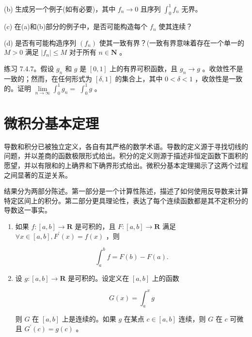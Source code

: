 (b) 生成另一个例子(如有必要)，其中 \({f}_{n} \rightarrow  0\) 且序列 \({\int }_{0}^{1}{f}_{n}\) 无界。

(c) 在(a)和(b)部分的例子中，是否可能构造每个 \({f}_{n}\) 使其连续？

(d) 是否有可能构造序列 \(\left( {f}_{n}\right)\) 使其一致有界？(一致有界意味着存在一个单一的 \(M > 0\) 满足 \(\left| {f}_{n}\right|  \leq  M\) 对于所有 \(n \in  \mathbf{N}\) 。

练习 7.4.7。假设 \({g}_{n}\) 和 \(g\) 是 \(\left\lbrack  {0,1}\right\rbrack\) 上的有界可积函数，且 \({g}_{n} \rightarrow  g\) 。收敛性不是一致的；然而，在任何形式为 \(\left\lbrack  {\delta ,1}\right\rbrack\) 的集合上，其中 \(0 < \delta  < 1\) ，收敛性是一致的。证明 \(\mathop{\lim }\limits_{{n \rightarrow  \infty }}{\int }_{0}^{1}{g}_{n} =\)  \({\int }_{0}^{1}g\) 。

\section{微积分基本定理}
\label{sec:7.5}
导数和积分已被独立定义，各自有其严格的数学术语。导数的定义源于寻找切线的问题，并以差商的函数极限形式给出。积分的定义则源于描述非恒定函数下面积的愿望，并以有限和的上确界和下确界形式给出。微积分基本定理揭示了这两个过程之间显著的互逆关系。

结果分为两部分陈述。第一部分是一个计算性陈述，描述了如何使用反导数来计算特定区间上的积分。第二部分更具理论性，表达了每个连续函数都是其不定积分的导数这一事实。

\begin{Thm}
  \label{thm:7.5.1}
  \begin{enumerate}[label = (\roman*)]
  \item\label{item:7.5.1}如果 \(f : \left\lbrack  {a,b}\right\rbrack   \rightarrow \mathbf{R}\) 是可积的，且 \(F : \left\lbrack  {a,b}\right\rbrack   \rightarrow  \mathbf{R}\) 满足 \(\forall x \in  \left\lbrack  {a,b}\right\rbrack, {F}^{\prime }\left( x\right)  = f\left( x\right)\) ，则

\[
{\int }_{a}^{b}f = F\left( b\right)  - F\left( a\right) .
\]
\item\label{item:7.5.2}设 \(g : \left\lbrack  {a,b}\right\rbrack   \rightarrow  \mathbf{R}\) 是可积的。设定义在 $[a,b]$ 上的函数

\[
G\left( x\right)  = {\int }_{a}^{x}g
\]

则 \(G\) 在 \(\left\lbrack  {a,b}\right\rbrack\) 上是连续的。如果 \(g\) 在某点 \(c \in  \left\lbrack  {a,b}\right\rbrack\) 连续，则 \(G\) 在 \(c\) 可微且 \({G}^{\prime }\left( c\right)  = g\left( c\right)\) 。
  \end{enumerate}
\end{Thm}


